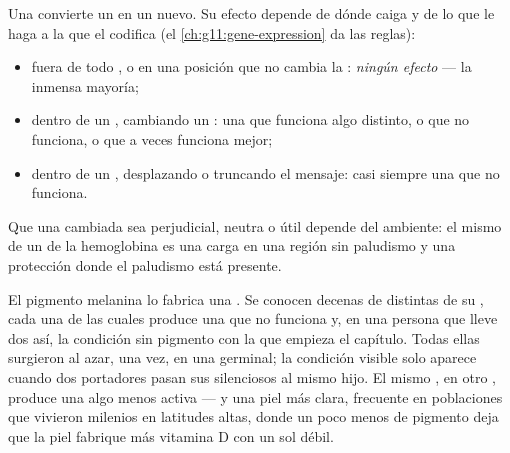 \begin{proposition}\label{prop:g11:mutations:consequences}
Una  convierte un  en un  nuevo. Su efecto depende de
dónde caiga y de lo que le haga a la  que el  codifica (el
\cref{ch:g11:gene-expression} da las reglas):
\begin{itemize}
  \item fuera de todo , o en una posición que no cambia la :
        \emph{ningún efecto} --- la inmensa mayoría;
  \item dentro de un , cambiando un : una  que
        funciona algo distinto, o que no funciona, o que a veces
        funciona mejor;
  \item dentro de un , desplazando o truncando el mensaje: casi
        siempre una  que no funciona.
\end{itemize}
Que una  cambiada sea perjudicial, neutra o útil depende del
ambiente: el mismo  de un  de la hemoglobina es una carga en
una región sin paludismo y una protección donde el paludismo está
presente.
\end{proposition}
\admitted

\begin{example}\label{ex:g11:mutations:pigment}
El pigmento melanina lo fabrica una . Se conocen decenas de
 distintas de su , cada una de las cuales produce una
 que no funciona y, en una persona que lleve dos  así, la
condición sin pigmento con la que empieza el capítulo. Todas ellas
surgieron al azar, una vez, en una  germinal; la condición
visible solo aparece cuando dos portadores pasan sus  silenciosos
al mismo hijo. El mismo , en otro , produce una  algo
menos activa --- y una piel más clara, frecuente en poblaciones que
vivieron milenios en latitudes altas, donde un poco menos de pigmento
deja que la piel fabrique más vitamina D con un sol débil.
\end{example}

